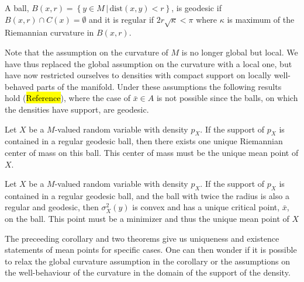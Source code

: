 \begin{definition}
A ball, $B(x,r) = \left\{ y \in M \, | \, \text{dist}(x,y) < r  \right\}$, is geodesic if $B(x,r) \cap C(x) = \emptyset$ and it is regular if $2r \sqrt{\kappa} < \pi$ where $\kappa$ is maximum of the Riemannian curvature in $B(x,r)$.
\end{definition}

Note that the assumption on the curvature of $M$ is no longer global but local. We have thus replaced the global assumption on the curvature with a local one, but have now restricted ourselves to densities with compact support on locally well-behaved parts of the manifold. Under these assumptions the following results hold (\hl{Reference}), where the case of $\bar{x} \in A$ is not possible since the balls, on which the densities have support, are geodesic. 

\begin{theorem}
Let $X$ be a $M$-valued random variable with density $p_X$. If the support of $p_X$ is contained in a regular geodesic ball, then there exists one unique Riemannian center of mass on this ball. This center of mass must be the unique mean point of $X$.
\end{theorem}

\begin{theorem}
Let $X$ be a $M$-valued random variable with density $p_X$. If the support of $p_X$ is contained in a regular geodesic ball, and the ball with twice the radius is also a regular and geodesic, then $\sigma^2_X(y)$ is convex and has a unique critical point, $\bar{x}$, on the ball. This point must be a minimizer and thus the unique mean point of $X$
\end{theorem}

The preceeding corollary and two theorems give us uniqueness and existence statements of mean points for specific cases. One can then wonder if it is possible to relax the global curvature assumption in the corollary or the assumptions on the well-behaviour of the curvature in the domain of the support of the density. 



